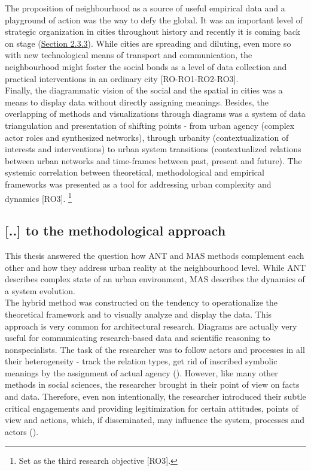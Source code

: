 \documentclass[11pt]{report}
\begin{document}
{{{The proposition of neighbourhood as a source of  useful empirical data and a playground of action was the way to defy the global. It was an important level of strategic organization in cities throughout history and recently it is coming back on stage (\href{Section 2.3.3}{Section 2.3.3}).
While cities are spreading and diluting, even more so with new technological means of transport and communication, the neighbourhood might foster the social bonds as a level of data collection and practical interventions in an ordinary city [RO-RO1-RO2-RO3].
\\

Finally, the diagrammatic vision of the social and the spatial  in cities was a means to display data without directly assigning meanings.
Besides, the overlapping of methods and visualizations through diagrams was a system of data triangulation and presentation of shifting points - from urban agency (complex actor roles and synthesized networks), through urbanity (contextualization of interests and interventions) to urban system transitions (contextualized relations between urban networks and time-frames between past, present and future). The systemic correlation between theoretical, methodological and empirical frameworks was presented as a tool for addressing urban complexity and dynamics [RO3].
\footnote{Set as the third research objective [RO3].}

\subsection{[..] to the methodological approach}

This thesis answered the question how ANT and MAS methods complement each other and how they address urban reality at the neighbourhood level.
While ANT describes complex state of an urban environment, MAS describes the dynamics of a system evolution.
\\

The hybrid method was constructed on the tendency to operationalize the theoretical framework and to visually analyze and display the data.
This approach is very common for architectural research.
Diagrams are actually very useful for communicating research-based data and scientific reasoning to nonspecialists.
The task of the researcher was to follow actors and processes in all their heterogeneity - track the relation types, get rid of inscribed symbolic meanings by the assignment of actual agency (\href{Nimmo}{\citealt{nimmo_actor-network_2011}}).
However, like many other methods in social sciences, 
the researcher brought in their point of view on facts and data.
Therefore, even non intentionally, the researcher introduced their subtle critical engagements and providing legitimization for certain attitudes, points of view and actions, which, if disseminated, may influence the system, processes and actors (\href{Baiocchi}{\citealt{baiocchi_actor-network_2013}}).
\\

}}}
\end{document}
